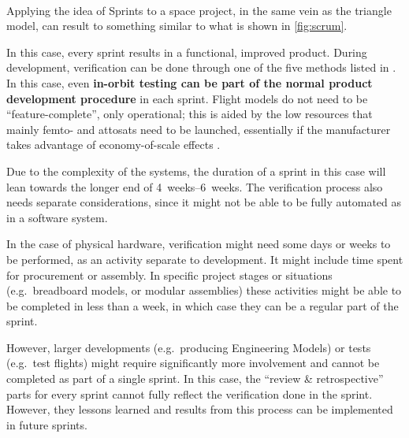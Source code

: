 \documentclass[]{iac}
\begin{document}
\paragraph{}


Applying the idea of Sprints to a space project, in the same vein as the triangle model, can result to something similar to what is shown in \autoref{fig:scrum}.

In this case, every sprint results in a functional, improved product.
During development, verification can be done through one of the five methods listed in . In this case, even \textbf{in-orbit testing can be part of the normal product development procedure} in each sprint. Flight models do not need to be ``feature-complete'', only operational; this is aided by the low resources that mainly femto- and attosats need to be launched, essentially if the manufacturer takes advantage of economy-of-scale effects \autocite{hein_attosats_2019}.

Due to the complexity of the systems, the duration of a sprint in this case will lean towards the longer end of \SIrange{4}{6}{weeks}. The verification process also needs separate considerations, since it might not be able to be fully automated as in a software system.

In the case of physical hardware, verification might need some days or weeks to be performed, as an activity separate to development. It might include time spent for procurement or assembly. In specific project stages or situations (e.g.~breadboard models, or modular assemblies) these activities might be able to be completed in less than a week, in which case they can be a regular part of the sprint.

However, larger developments (e.g.~producing Engineering Models) or tests (e.g.~test flights) might require significantly more involvement and cannot be completed as part of a single sprint. In this case, the ``review \& retrospective'' parts for every sprint cannot fully reflect the verification done in the sprint. However, they lessons learned and results from this process can be implemented in future sprints.
\end{document}
